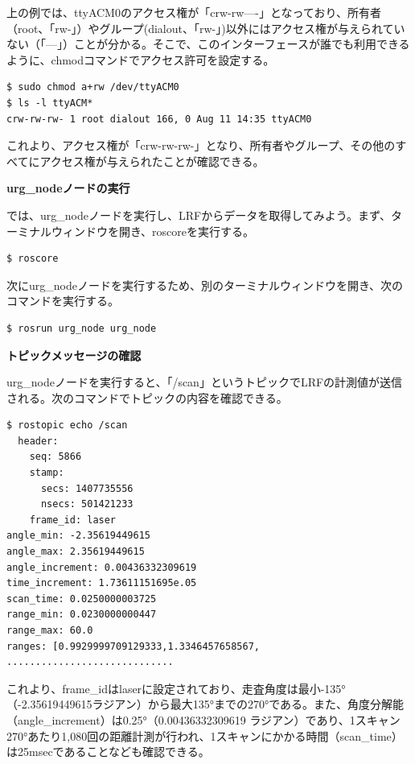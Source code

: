 上の例では、ttyACM0のアクセス権が「crw-rw----」となっており、所有者（root、「rw-」）やグループ(dialout、「rw-」)以外にはアクセス権が与えられていない（「---」）ことが分かる。そこで、このインターフェースが誰でも利用できるように、chmodコマンドでアクセス許可を設定する。

\begin{lstlisting}[language=ROS]
$ sudo chmod a+rw /dev/ttyACM0
$ ls -l ttyACM*
crw-rw-rw- 1 root dialout 166, 0 Aug 11 14:35 ttyACM0
\end{lstlisting}

これより、アクセス権が「crw-rw-rw-」となり、所有者やグループ、その他のすべてにアクセス権が与えられたことが確認できる。

\textbf{urg\_nodeノードの実行}

では、urg\_nodeノードを実行し、LRFからデータを取得してみよう。まず、ターミナルウィンドウを開き、roscoreを実行する。

\begin{lstlisting}[language=ROS]
$ roscore
\end{lstlisting}

次にurg\_nodeノードを実行するため、別のターミナルウィンドウを開き、次のコマンドを実行する。

\begin{lstlisting}[language=ROS]
$ rosrun urg_node urg_node
\end{lstlisting}

\textbf{トピックメッセージの確認}

urg\_nodeノードを実行すると、「/scan」というトピックでLRFの計測値が送信される。次のコマンドでトピックの内容を確認できる。

\begin{lstlisting}[language=ROS]
$ rostopic echo /scan
  header:
    seq: 5866
    stamp:
      secs: 1407735556
      nsecs: 501421233
    frame_id: laser
angle_min: -2.35619449615
angle_max: 2.35619449615
angle_increment: 0.00436332309619
time_increment: 1.73611151695e.05
scan_time: 0.0250000003725
range_min: 0.0230000000447
range_max: 60.0
ranges: [0.9929999709129333,1.3346457658567, .............................
\end{lstlisting}

これより、frame\_idはlaserに設定されており、走査角度は最小-135°（-2.35619449615ラジアン）から最大135°までの270°である。また、角度分解能（angle\_increment）は0.25°（0.00436332309619 ラジアン）であり、1スキャン270°あたり1,080回の距離計測が行われ、1スキャンにかかる時間（scan\_time）は25msecであることなども確認できる。

